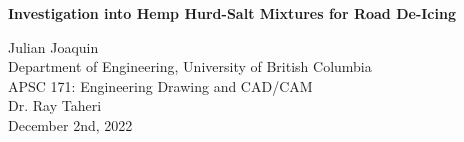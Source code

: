 \documentclass[12pt]{article}
\begin{document}
  \begin{center}
    \vspace*{\fill}

    \textbf{Investigation into Hemp Hurd-Salt Mixtures for Road De-Icing}
    \vspace{4em}

    Julian Joaquin \\
    Department of Engineering, University of British Columbia \\
    APSC 171: Engineering Drawing and CAD/CAM \\
    Dr. Ray Taheri \\
    December 2nd, 2022

    \vspace*{\fill}
  \end{center}

  \newpage
  

  

  

  

  

  

  \newpage

  \printbibliography
\end{document}
